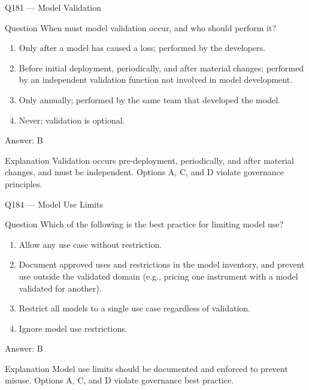 \documentclass[aspectratio=169,8pt]{beamer}
\begin{document}
\begin{frame}{Q181 --- Model Validation}
\begin{block}{Question}
When must model validation occur, and who should perform it?
\begin{enumerate}
\item Only after a model has caused a loss; performed by the developers.
\item Before initial deployment, periodically, and after material changes; performed by an independent validation function not involved in model development.
\item Only annually; performed by the same team that developed the model.
\item Never; validation is optional.
\end{enumerate}  \end{block}
\begin{exampleblock}{Answer: B}\end{exampleblock}
\begin{block}{Explanation}
Validation occurs pre-deployment, periodically, and after material changes, and must be independent. Options A, C, and D violate governance principles.
\end{block}
\end{frame}


\begin{frame}{Q184 --- Model Use Limits}
\begin{block}{Question}
Which of the following is the best practice for limiting model use?
\begin{enumerate}
\item Allow any use case without restriction.
\item Document approved uses and restrictions in the model inventory, and prevent use outside the validated domain (e.g., pricing one instrument with a model validated for another).
\item Restrict all models to a single use case regardless of validation.
\item Ignore model use restrictions.
\end{enumerate}  \end{block}
\begin{exampleblock}{Answer: B}\end{exampleblock}
\begin{block}{Explanation}
Model use limits should be documented and enforced to prevent misuse. Options A, C, and D violate governance best practice.
\end{block}
\end{frame}
\end{document}
